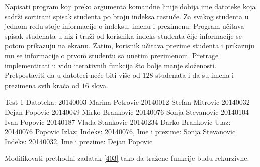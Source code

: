 \begin{Answer}[ref=402]
\end{Answer}
\begin{Exercise}[label=403]
  Napisati program koji preko argumenta komandne linije dobija ime
  datoteke koja sadrži sortirani spisak studenta po broju indeksa
  rastuće. Za svakog studenta u jednom redu stoje informacije o
  indeksu, imenu i prezimenu.  Program učitava spisak studenata u niz
  i traži od korisnika indeks studenta čije informacije se potom
  prikazuju na ekranu.  Zatim, korisnik učitava prezime studenta i
  prikazuju mu se informacije o prvom studentu sa unetim prezimenom.
  Pretrage implementirati u vidu iterativnih funkcija što bolje manje
  složenosti. Pretpostaviti da u datoteci neće biti više od $128$
  studenata i da su imena i prezimena svih kraća od $16$ slova.
  
\begin{maxitest}
\begin{test}{Test 1}
Datoteka:
  20140003 Marina Petrovic
  20140012 Stefan Mitrovic
  20140032 Dejan Popovic
  20140049 Mirko Brankovic
  20140076 Sonja Stevanovic
  20140104 Ivan Popovic
  20140187 Vlada Stankovic
  20140234 Darko Brankovic
Ulaz:
  20140076
  Popovic
Izlaz:
  Indeks: 20140076, Ime i prezime: Sonja Stevanovic
  Indeks: 20140032, Ime i prezime: Dejan Popovic
\end{test}
\end{maxitest}


\end{Exercise}

\begin{Answer}[ref=403]
\end{Answer}
\begin{Exercise}[label=404]
  Modifikovati prethodni zadatak \ref{403} tako da tražene funkcije
  budu rekurzivne.


\end{Exercise}

